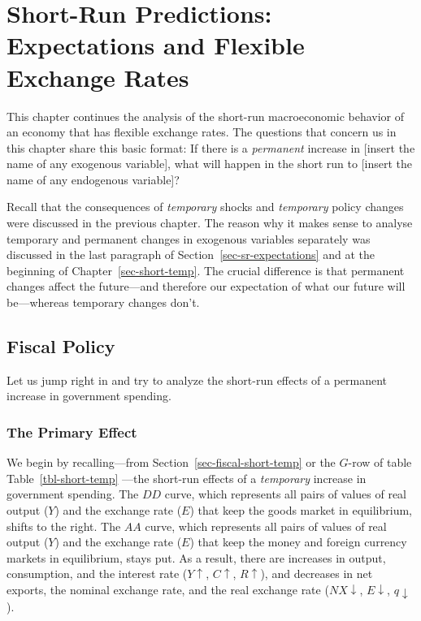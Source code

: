 \documentclass[
  letterpaper,
]{book}
\theoremstyle{plain}
\theoremstyle{remark}
\begin{document}

\chapter{Short-Run Predictions: Expectations and Flexible Exchange
Rates}\label{sec-short-perm}

This chapter continues the analysis of the short-run macroeconomic
behavior of an economy that has flexible exchange rates. The questions
that concern us in this chapter share this basic format: If there is a
\emph{permanent} increase in {[}insert the name of any exogenous
variable{]}, what will happen in the short run to {[}insert the name of
any endogenous variable{]}?

Recall that the consequences of \emph{temporary} shocks and
\emph{temporary} policy changes were discussed in the previous chapter.
The reason why it makes sense to analyse temporary and permanent changes
in exogenous variables separately was discussed in the last paragraph of
Section~\ref{sec-sr-expectations} and at the beginning of
Chapter~\ref{sec-short-temp}. The crucial difference is that permanent
changes affect the future---and therefore our expectation of what our
future will be---whereas temporary changes don't.

\section{Fiscal Policy}\label{sec-fiscal-short-perm}

Let us jump right in and try to analyze the short-run effects of a
permanent increase in government spending.

\subsection{The Primary Effect}\label{sec-fiscal-short-perm-primary}

We begin by recalling---from Section~\ref{sec-fiscal-short-temp} or the
\(G\)-row of table Table~\ref{tbl-short-temp} ---the short-run effects
of a \emph{temporary} increase in government spending. The \(DD\) curve,
which represents all pairs of values of real output (\(Y\)) and the
exchange rate (\(E\)) that keep the goods market in equilibrium, shifts
to the right. The \(AA\) curve, which represents all pairs of values of
real output (\(Y\)) and the exchange rate (\(E\)) that keep the money
and foreign currency markets in equilibrium, stays put. As a result,
there are increases in output, consumption, and the interest rate
(\(Y\uparrow\), \(C\uparrow\), \(R\uparrow\)), and decreases in net
exports, the nominal exchange rate, and the real exchange rate
(\(NX\downarrow\), \(E\downarrow\), \(q\downarrow\)).
\end{document}
